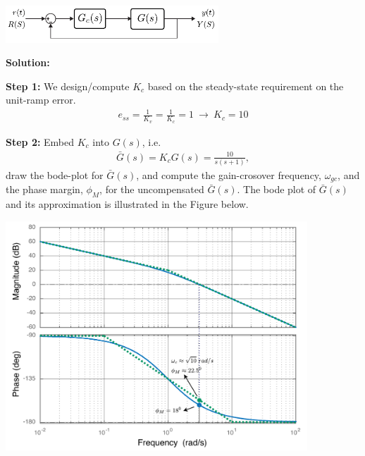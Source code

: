 \documentclass[twoside]{article}
\begin{document}
\vspace{6pt}

     \begin{center}
 \begin{minipage}[h]{\linewidth}
     \begin{center}
       \includegraphics[width=0.6\textwidth]{ex1block}
     \end{center}
 \end{minipage}
     \end{center}

\vspace{6pt}

\textbf{Solution:}

\textbf{Step 1:} We design/compute $K_c$ based on the steady-state 
requirement on the unit-ramp error.  
%
\begin{align}
   e_{ss} = \frac{1}{K_v} = \frac{1}{K_c} = 1 \ \rightarrow \ K_c = 10
\end{align}

\textbf{Step 2:} Embed $K_c$ into $G(s)$, i.e. 
%
\begin{align*}
  \bar{G}(s) = K_c G(s) = \frac{10}{s (s+1)} ,
\end{align*} 
%
draw the bode-plot for $\bar{G}(s)$, and compute the gain-crosover
frequency, $\omega_{gc}$, and the phase margin, $\phi_M$, for the
uncompensated $\bar{G}(s)$. The bode plot of $\bar{G}(s)$ and its
approximation is illustrated in the Figure below. 

     \begin{center}
 \begin{minipage}[h]{\linewidth}
     \begin{center}
       \includegraphics[width=0.85\textwidth]{bodesystem}
     \end{center}
 \end{minipage}
     \end{center}
\end{document}
